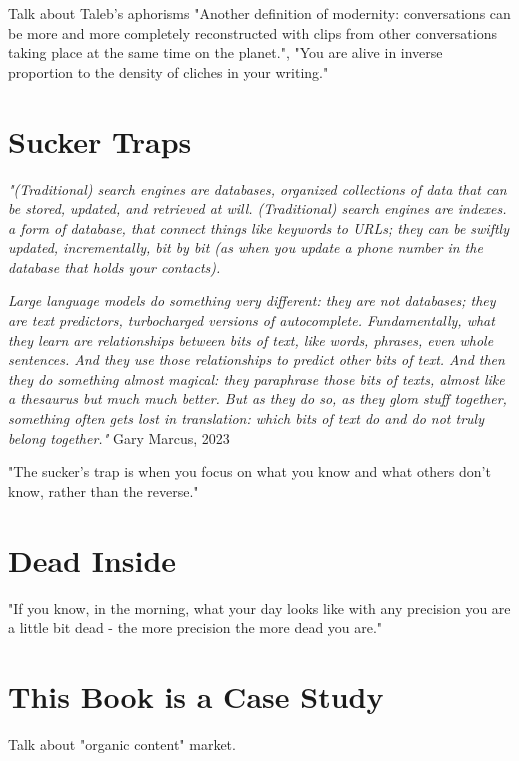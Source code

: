 Talk about Taleb's aphorisms "Another definition of modernity: conversations can be more and more completely reconstructed with clips from other conversations taking place at the same time on the planet.", "You are alive in inverse proportion to the density of cliches in your writing."

\section{Sucker Traps}

\textit{"(Traditional) search engines are databases, organized collections of data that can be stored, updated, and retrieved at will. (Traditional) search engines are indexes. a form of database, that connect things like keywords to URLs; they can be swiftly updated, incrementally, bit by bit (as when you update a phone number in the database that holds your contacts).}

\textit{Large language models do something very different: they are not databases; they are text predictors, turbocharged versions of autocomplete. Fundamentally, what they learn are relationships between bits of text, like words, phrases, even whole sentences. And they use those relationships to predict other bits of text. And then they do something almost magical: they paraphrase those bits of texts, almost like a thesaurus but much much better. But as they do so, as they glom stuff together, something often gets lost in translation: which bits of text do and do not truly belong together."} Gary Marcus, 2023 \cite{marcus2023}

"The sucker's trap is when you focus on what you know and what others don't know, rather than the reverse."

\section{Dead Inside}

"If you know, in the morning, what your day looks like with any precision you are a little bit dead - the more precision the more dead you are."

\section{This Book is a Case Study}

Talk about "organic content" market.
